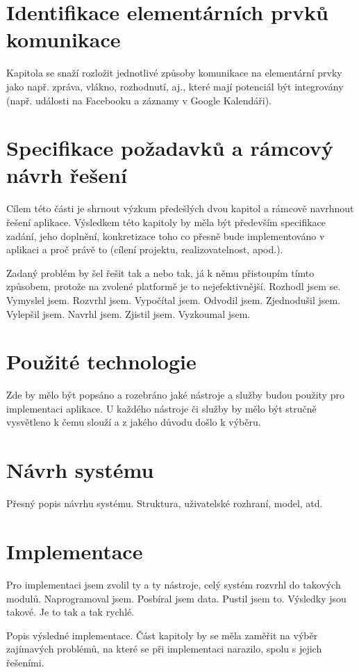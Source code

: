 \documentclass[12pt,oneside,final]{fithesis2}
\begin{document}
\chapter{Identifikace elementárních prvků komunikace}
Kapitola se snaží rozložit jednotlivé způsoby komunikace na elementární
prvky jako např. zpráva, vlákno, rozhodnutí, aj., které mají potenciál být
integrovány (např. události na Facebooku a záznamy v Google Kalendáři).

\chapter{Specifikace požadavků a rámcový návrh řešení}
Cílem této části je shrnout výzkum předešlých dvou kapitol a rámcově navrhnout řešení aplikace. Výsledkem této kapitoly by měla být především specifikace zadání, jeho doplnění, konkretizace toho co přesně bude implementováno v aplikaci a proč právě to (cílení projektu, realizovatelnost, apod.).

Zadaný problém by šel řešit tak a nebo tak, já k němu přistoupím tímto způsobem, protože na zvolené platformě je to nejefektivnější. Rozhodl jsem se. Vymyslel jsem. Rozvrhl jsem. Vypočítal jsem. Odvodil jsem. Zjednodušil jsem. Vylepšil jsem. Navrhl jsem. Zjistil jsem. Vyzkoumal jsem.

\chapter{Použité technologie}
Zde by mělo být popsáno a rozebráno jaké nástroje a služby budou použity pro implementaci aplikace. U každého nástroje či služby by mělo být stručně vysvětleno k čemu slouží a z jakého důvodu došlo k výběru.

\chapter{Návrh systému}
Přesný popis návrhu systému. Struktura, uživatelské rozhraní, model, atd.

\chapter{Implementace}
Pro implementaci jsem zvolil ty a ty nástroje, celý systém rozvrhl do takových modulů. Naprogramoval jsem. Posbíral jsem data. Pustil jsem to. Výsledky jsou takové. Je to tak a tak rychlé.

Popis výsledné implementace. Část kapitoly by se měla zaměřit na výběr zajímavých problémů, na které se při implementaci narazilo, spolu s jejich řešeními.
\end{document}
